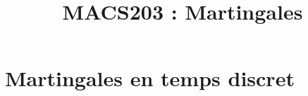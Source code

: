 \documentclass[a4paper,9pt]{article}
\title{\vspace{-1.2cm} \textbf{MACS203 : Martingales}}
\begin{document}
\maketitle

\vspace{-1.5cm}


%	


%	

\section{Martingales en temps discret}

	
\end{document}
